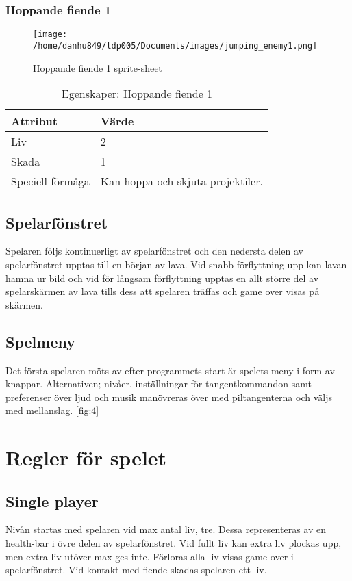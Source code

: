 \documentclass{TDP005mall}
\begin{document}
\subsubsection*{Hoppande fiende 1}
\begin{figure}[h!]
   \caption{Hoppande fiende 1 sprite-sheet\label{fig:3}}
  \centerline{\texttt{[image: /home/danhu849/tdp005/Documents/images/jumping\_enemy1.png]}}
\end{figure}

\begin{table}[h!]
  \centering
  \caption{Egenskaper: Hoppande fiende 1\label{tab:4}}
\begin{tabular}{|l|l|}
\hline
Attribut & Värde \\\hline
Liv & 2 \\\hline
Skada & 1 \\\hline
Speciell förmåga & Kan hoppa och skjuta projektiler. \\\hline
\end{tabular}
\end{table}

\subsection{Spelarfönstret}
Spelaren följs kontinuerligt av spelarfönstret och den nedersta delen av spelarfönstret upptas till en början av lava. Vid snabb förflyttning upp kan lavan hamna ur bild och vid för långsam förflyttning upptas en allt större del av spelarskärmen av lava tills dess att spelaren träffas och game over visas på skärmen.


\subsection{Spelmeny}
Det första spelaren möts av efter programmets start är spelets meny i form av knappar. Alternativen; nivåer, inställningar för tangentkommandon samt preferenser över ljud och musik manövreras över med piltangenterna och väljs med mellanslag. \ref{fig:4} 

\section{Regler för spelet}%

\subsection{Single player}
Nivån startas med spelaren vid max antal liv, tre. Dessa representeras av en health-bar i övre delen av spelarfönstret. Vid fullt liv kan extra liv plockas upp, men extra liv utöver max ges inte. Förloras alla liv visas game over i spelarfönstret. Vid kontakt med fiende skadas spelaren ett liv.
\end{document}
